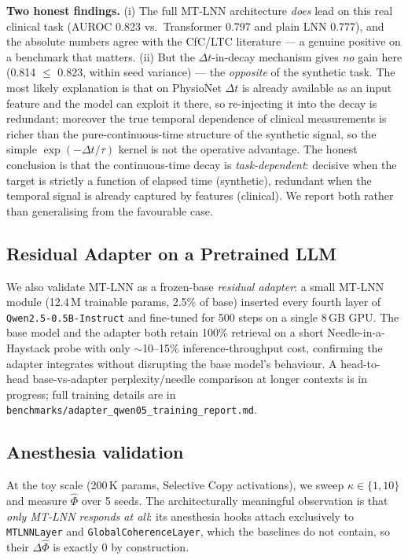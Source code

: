 \documentclass[11pt]{article}
\theoremstyle{definition}
\begin{document}
\textbf{Two honest findings.} (i) The full MT-LNN architecture \emph{does} lead on this real clinical task (AUROC 0.823 vs.\ Transformer 0.797 and plain LNN 0.777), and the absolute numbers agree with the CfC/LTC literature — a genuine positive on a benchmark that matters. (ii) But the $\Delta t$-in-decay mechanism gives \emph{no} gain here (0.814 $\le$ 0.823, within seed variance) — the \emph{opposite} of the synthetic task. The most likely explanation is that on PhysioNet $\Delta t$ is already available as an input feature and the model can exploit it there, so re-injecting it into the decay is redundant; moreover the true temporal dependence of clinical measurements is richer than the pure-continuous-time structure of the synthetic signal, so the simple $\exp(-\Delta t/\tau)$ kernel is not the operative advantage. The honest conclusion is that the continuous-time decay is \emph{task-dependent}: decisive when the target is strictly a function of elapsed time (synthetic), redundant when the temporal signal is already captured by features (clinical). We report both rather than generalising from the favourable case.

\subsection{Residual Adapter on a Pretrained LLM}
We also validate MT-LNN as a frozen-base \emph{residual adapter}: a small MT-LNN module (12.4\,M trainable params, 2.5\% of base) inserted every fourth layer of \texttt{Qwen2.5-0.5B-Instruct} and fine-tuned for 500 steps on a single 8\,GB GPU. The base model and the adapter both retain 100\% retrieval on a short Needle-in-a-Haystack probe with only $\sim$10--15\% inference-throughput cost, confirming the adapter integrates without disrupting the base model's behaviour. A head-to-head base-vs-adapter perplexity/needle comparison at longer contexts is in progress; full training details are in \texttt{benchmarks/adapter\_qwen05\_training\_report.md}.

\subsection{Anesthesia validation}
\label{sec:anesth_results}

At the toy scale (200\,K params, Selective Copy activations), we sweep $\kappa\in\{1,10\}$ and measure $\hat{\Phi}$ over 5 seeds. The architecturally meaningful observation is that \emph{only MT-LNN responds at all}: its anesthesia hooks attach exclusively to \texttt{MTLNNLayer} and \texttt{GlobalCoherenceLayer}, which the baselines do not contain, so their $\Delta\hat{\Phi}$ is exactly $0$ by construction.
\end{document}
